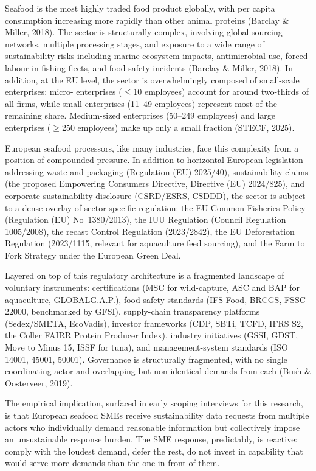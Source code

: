 \documentclass[
]{article}
\begin{document}
Seafood is the most highly traded food product globally, with per capita
consumption increasing more rapidly than other animal proteins (Barclay
\& Miller, 2018). The sector is structurally complex, involving global
sourcing networks, multiple processing stages, and exposure to a wide
range of sustainability risks including marine
ecosystem impacts, antimicrobial use, forced labour in fishing fleets,
and food safety incidents (Barclay \& Miller, 2018). In addition, at the EU level, the sector is overwhelmingly composed of small-scale enterprises: micro-
enterprises ($\leq$10 employees) account for around two-thirds of all firms, while small
enterprises (11--49 employees) represent most of the remaining share. Medium-sized
enterprises (50--249 employees) and large enterprises ($\geq$250 employees) make
up only a small fraction (STECF, 2025).

European seafood processors, like many industries, face this complexity from a position of
compounded pressure. In addition to horizontal European legislation
addressing waste and packaging (Regulation (EU) 2025/40), sustainability
claims (the proposed Empowering Consumers Directive, Directive (EU)
2024/825), and corporate sustainability disclosure (CSRD/ESRS, CSDDD),
the sector is subject to a dense overlay of sector-specific regulation:
the EU Common Fisheries Policy (Regulation (EU) No~1380/2013), the IUU
Regulation (Council Regulation 1005/2008), the recast Control Regulation
(2023/2842), the EU Deforestation Regulation (2023/1115, relevant for
aquaculture feed sourcing), and the Farm to Fork Strategy under the
European Green Deal.

Layered on top of this regulatory architecture is a fragmented landscape
of voluntary instruments: certifications (MSC for wild-capture, ASC and
BAP for aquaculture, GLOBALG.A.P.), food safety standards (IFS Food,
BRCGS, FSSC 22000, benchmarked by GFSI), supply-chain transparency
platforms (Sedex/SMETA, EcoVadis), investor frameworks (CDP, SBTi, TCFD,
IFRS S2, the Coller FAIRR Protein Producer Index), industry initiatives
(GSSI, GDST, Move to Minus 15, ISSF for tuna), and management-system
standards (ISO 14001, 45001, 50001). Governance is structurally
fragmented, with no single coordinating actor and overlapping but
non-identical demands from each (Bush \& Oosterveer, 2019).

The empirical implication, surfaced in early scoping interviews for this
research, is that European seafood SMEs receive sustainability data
requests from multiple actors who individually demand reasonable
information but collectively impose an unsustainable response burden.
The SME response, predictably, is reactive: comply with the loudest
demand, defer the rest, do not invest in capability that would serve
more demands than the one in front of them.
\end{document}
